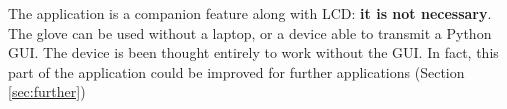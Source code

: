 The application is a companion feature along with LCD: \textbf{it is not necessary}. The glove can be used without a laptop, or a device able to transmit a Python GUI. The device is been thought entirely to work without the GUI. In fact, this part of the application could be improved for further applications (Section \ref{sec:further})